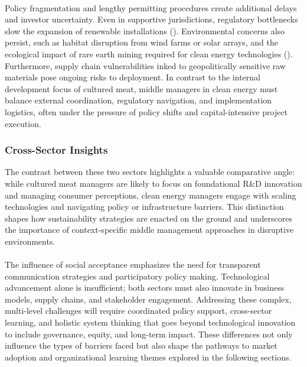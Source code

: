 	\paragraph*{} Policy fragmentation and lengthy permitting procedures create additional delays and investor uncertainty. Even in supportive jurisdictions, regulatory bottlenecks slow the expansion of renewable installations (\textcite{Zhang2016}). Environmental concerns also persist, such as habitat disruption from wind farms or solar arrays, and the ecological impact of rare earth mining required for clean energy technologies (\textcite{IEA2021}). Furthermore, supply chain vulnerabilities inked to geopolitically sensitive raw materials pose ongoing risks to deployment. In contrast to the internal development focus of cultured meat, middle managers in clean energy must balance external coordination, regulatory navigation, and implementation logistics, often under the pressure of policy shifts and capital-intensive project execution.
	
	\subsubsection{Cross-Sector Insights}
	The contrast between these two sectors highlights a valuable comparative angle: while cultured meat managers are likely to focus on foundational R\&D innovation and managing consumer perceptions, clean energy managers engage with scaling technologies and navigating policy or infrastructure barriers. This distinction shapes how sustainability strategies are enacted on the ground and underscores the importance of context-specific middle management approaches in disruptive environments.
	
	\paragraph*{} The influence of social acceptance emphasizes the need for transparent communication strategies and participatory policy making. Technological advancement alone is insufficient; both sectors must also innovate in business models, supply chains, and stakeholder engagement. Addressing these complex, multi-level challenges will require coordinated policy support, cross-sector learning, and holistic system thinking that goes beyond technological innovation to include governance, equity, and long-term impact. These differences not only influence the types of barriers faced but also shape the pathways to market adoption and organizational learning themes explored in the following sections.
	
